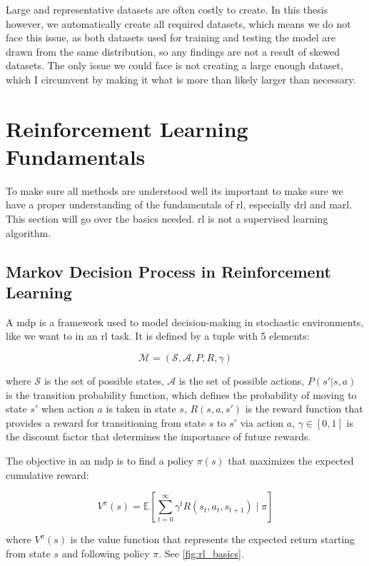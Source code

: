 \documentclass[UKenglish]{uiomasterthesis}
\begin{document}
Large and representative datasets are often costly to create. In this thesis however, we automatically create all required datasets, which means we do not face this issue, as both datasets used for training and testing the model are drawn from the same distribution, so any findings are not a result of skewed datasets. The only issue we could face is not creating a large enough dataset, which I circumvent by making it what is more than likely larger than necessary. 

\section{Reinforcement Learning Fundamentals}
To make sure all methods are understood well its important to make sure we have a proper understanding of the fundamentals of \ac{rl}, especially \ac{drl} and \ac{marl}. This section will go over the basics needed. \ac{rl} is not a supervised learning algorithm.


\subsection{Markov Decision Process in Reinforcement Learning}

A \ac{mdp} is a framework used to model decision-making in stochastic environments, like we want to in an \ac{rl} task. It is defined by a tuple with 5 elements:

$$\mathcal{M} = (\mathcal{S}, \mathcal{A}, P, R, \gamma)$$

where \(\mathcal{S}\) is the set of possible states, \(\mathcal{A}\) is the set of possible actions, \(P(s' | s, a)\) is the transition probability function, which defines the probability of moving to state \(s'\) when action \(a\) is taken in state \(s\), \(R(s, a, s')\) is the reward function that provides a reward for transitioning from state \(s\) to \(s'\) via action \(a\), \(\gamma \in [0,1]\) is the discount factor that determines the importance of future rewards.

The objective in an \ac{mdp} is to find a policy \(\pi(s)\) that maximizes the expected cumulative reward:

$$V^\pi(s) = \mathbb{E} \left[ \sum_{t=0}^{\infty} \gamma^t R(s_t, a_t, s_{t+1}) \mid \pi \right]$$

where \(V^\pi(s)\) is the value function that represents the expected return starting from state \(s\) and following policy \(\pi\). See \cref{fig:rl_basics}.
\end{document}
